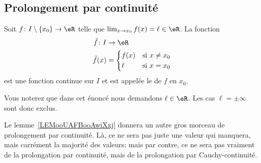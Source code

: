 \subsection{Prolongement par continuité}

\begin{propositionDef}
    Soit \( f\colon I\setminus\{ x_0 \}\to \eR\) telle que \( \lim_{x\to x_{0}} f(x)=\ell\in \eR\). La fonction
    \begin{equation}
        \begin{aligned}
            \tilde f\colon I&\to \eR \\
            \tilde f(x)&=\begin{cases}
                f(x)    &   \text{si } x\neq x_0\\
                \ell    &    \text{si } x=x_0
            \end{cases}
        \end{aligned}
    \end{equation}
    est une fonction continue sur \( I\) et est appelée le  de \( f\) en \( x_0\).
\end{propositionDef}
Vous noterez que dans cet énoncé nous demandons \( \ell\in \eR\). Les cas \( \ell=\pm\infty\) sont donc exclus.

\begin{normaltext}
    Le lemme~\ref{LEMooUAFBooAwiXxj} donnera un autre gros morceau de prolongement par continuité. Là, ce ne sera pas juste une valeur qui manquera, mais carrément la majorité des valeurs; mais par contre, ce ne sera pas vraiment de la prolongation par continuité, mais de la prolongation par Cauchy-continuité.
\end{normaltext}

